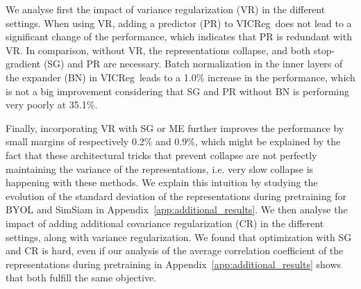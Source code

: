 \documentclass{article} %
\newcommand{\algo}{VICReg}
\newcommand{\expander}{expander }
\begin{document}
We analyse first the impact of variance regularization (VR) in the different settings. When using VR, adding a predictor (PR) to \algo \ does not lead to a significant change of the performance, which indicates that PR is redundant with VR. In comparison, without VR, the representations collapse, and both stop-gradient (SG) and PR are necessary. Batch normalization in the inner layers of the \expander (BN) in \algo \ leads to a 1.0\% increase in the performance, which is not a big improvement considering that SG and PR without BN is performing very poorly at 35.1\%. 

Finally, incorporating VR with SG or ME further improves the performance by small margins of respectively 0.2\% and 0.9\%, which might be explained by the fact that these architectural tricks that prevent collapse are not perfectly maintaining the variance of the representations, i.e. very slow collapse is happening with these methods. We explain this intuition by studying the evolution of the standard deviation of the representations during pretraining for BYOL and SimSiam in Appendix~\ref{app:additional_results}. We then analyse the impact of adding additional covariance regularization (CR) in the different settings, along with variance regularization. We found that optimization with SG and CR is hard, even if our analysis of the average correlation coefficient of the representations during pretraining in Appendix~\ref{app:additional_results} shows that both fulfill the same objective. 
\end{document}
